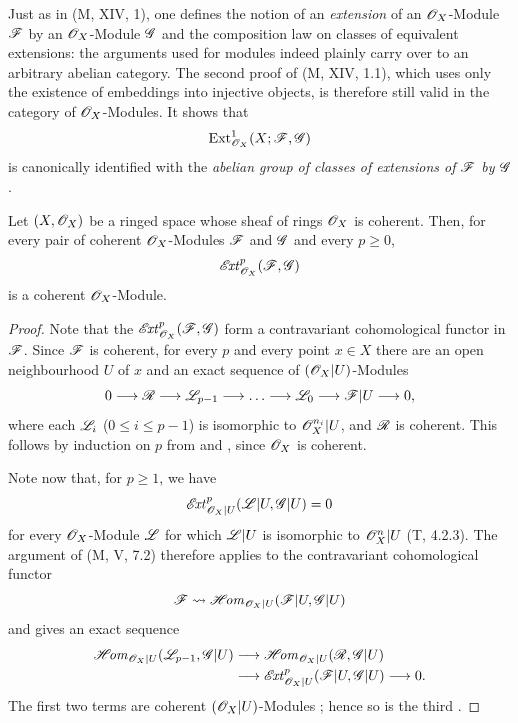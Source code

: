 \begin{env}[12.3.2]
\label{0.12.3.2}
Just as in (M, XIV, 1), one defines the notion of an
\emph{extension} of an $\mathscr{O}_X$-Module $\mathscr{F}$ by an
$\mathscr{O}_X$-Module $\mathscr{G}$ and the composition law on classes of
equivalent extensions: the arguments used for modules indeed plainly carry
over to an arbitrary abelian category.
The second proof of (M, XIV, 1.1), which uses only the existence of
embeddings into injective objects, is therefore still valid in the
category of $\mathscr{O}_X$-Modules.  It shows that
\[
  \operatorname{Ext}^1_{\mathscr{O}_X}(X;\mathscr{F},\mathscr{G})
\]
is canonically identified with the \emph{abelian group of classes of
extensions of $\mathscr{F}$ by $\mathscr{G}$}.
\end{env}

\begin{proposition}[12.3.3]
\label{0.12.3.3}
Let $(X,\mathscr{O}_X)$ be a ringed space whose sheaf of rings
$\mathscr{O}_X$ is coherent.
Then, for every pair of coherent $\mathscr{O}_X$-Modules $\mathscr{F}$ and
$\mathscr{G}$ and every $p\geq0$,
\[
  \mathscr{E}\!\mathit{xt}^p_{\mathscr{O}_X}(\mathscr{F},\mathscr{G})
\]
is a coherent $\mathscr{O}_X$-Module.
\end{proposition}

\begin{proof}
Note that the $\mathscr{E}\!\mathit{xt}^p_{\mathscr{O}_X}(\mathscr{F},\mathscr{G})$ form a contravariant
cohomological functor in $\mathscr{F}$.
Since $\mathscr{F}$ is coherent, for every $p$ and every point $x\in X$
there are an open neighbourhood $U$ of $x$ and an exact
sequence of $(\mathscr{O}_X|U)$-Modules
\[
  0\longrightarrow\mathscr{R}\longrightarrow\mathscr{L}_{p-1}
  \longrightarrow\ldots\longrightarrow\mathscr{L}_0
  \longrightarrow\mathscr{F}|U\longrightarrow0,
\]
where each $\mathscr{L}_i$ ($0\leq i\leq p-1$) is isomorphic to
$\mathscr{O}_X^{n_i}|U$, and $\mathscr{R}$ is coherent.
This follows by induction on $p$ from
 and
, since $\mathscr{O}_X$ is coherent.

Note now that, for $p\geq1$, we have
\[
  \mathscr{E}\!\mathit{xt}^p_{\mathscr{O}_X|U}(\mathscr{L}|U,\mathscr{G}|U)=0
\]
for every $\mathscr{O}_X$-Module $\mathscr{L}$ for which $\mathscr{L}|U$ is
isomorphic to $\mathscr{O}_X^n|U$ (T, 4.2.3).
The argument of (M, V, 7.2) therefore applies to the contravariant
cohomological functor
\[
  \mathscr{F}\leadsto
  \mathscr{H}\!\mathit{om}_{\mathscr{O}_X|U}(\mathscr{F}|U,\mathscr{G}|U)
\]
and gives an exact sequence
\[
  \begin{aligned}
  \mathscr{H}\!\mathit{om}_{\mathscr{O}_X|U}(\mathscr{L}_{p-1},\mathscr{G}|U)
  &\longrightarrow
  \mathscr{H}\!\mathit{om}_{\mathscr{O}_X|U}(\mathscr{R},\mathscr{G}|U)\\
  &\longrightarrow
  \mathscr{E}\!\mathit{xt}^p_{\mathscr{O}_X|U}(\mathscr{F}|U,\mathscr{G}|U)
  \longrightarrow0.
  \end{aligned}
\]
The first two terms are coherent $(\mathscr{O}_X|U)$-Modules
; hence so is the third
.
\end{proof}

